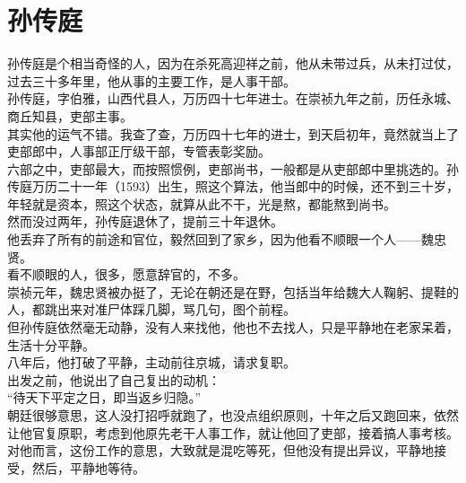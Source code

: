 \section{孙传庭}
\ifnum{}
	\begin{multicols}{\theparacolNo}
\fi
孙传庭是个相当奇怪的人，因为在杀死高迎祥之前，他从未带过兵，从未打过仗，过去三十多年里，他从事的主要工作，是人事干部。\\

孙传庭，字伯雅，山西代县人，万历四十七年进士。在崇祯九年之前，历任永城、商丘知县，吏部主事。\\

其实他的运气不错。我查了查，万历四十七年的进士，到天启初年，竟然就当上了吏部郎中，人事部正厅级干部，专管表彰奖励。\\

六部之中，吏部最大，而按照惯例，吏部尚书，一般都是从吏部郎中里挑选的。孙传庭万历二十一年（1593）出生，照这个算法，他当郎中的时候，还不到三十岁，年轻就是资本，照这个状态，就算从此不干，光是熬，都能熬到尚书。\\

然而没过两年，孙传庭退休了，提前三十年退休。\\

他丢弃了所有的前途和官位，毅然回到了家乡，因为他看不顺眼一个人——魏忠贤。\\

看不顺眼的人，很多，愿意辞官的，不多。\\

崇祯元年，魏忠贤被办挺了，无论在朝还是在野，包括当年给魏大人鞠躬、提鞋的人，都跳出来对准尸体踩几脚，骂几句，图个前程。\\

但孙传庭依然毫无动静，没有人来找他，他也不去找人，只是平静地在老家呆着，生活十分平静。\\

八年后，他打破了平静，主动前往京城，请求复职。\\

出发之前，他说出了自己复出的动机：\\

“待天下平定之日，即当返乡归隐。”\\

朝廷很够意思，这人没打招呼就跑了，也没点组织原则，十年之后又跑回来，依然让他官复原职，考虑到他原先老干人事工作，就让他回了吏部，接着搞人事考核。\\

对他而言，这份工作的意思，大致就是混吃等死，但他没有提出异议，平静地接受，然后，平静地等待。\\


\end{multicols}
